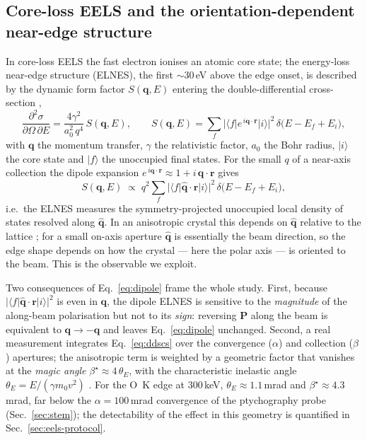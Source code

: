 \subsection{Core-loss EELS and the orientation-dependent near-edge structure}
\label{sec:eels-elnes}

In core-loss EELS the fast electron ionises an atomic core state; the energy-loss near-edge
structure (ELNES), the first ${\sim}30$\,eV above the edge onset, is described by the dynamic
form factor $S(\mathbf{q},E)$ entering the double-differential cross-section
\citep{Egerton2011},
\begin{equation}
  \frac{\partial^2\sigma}{\partial\Omega\,\partial E}
  = \frac{4\gamma^2}{a_0^2\,q^4}\,S(\mathbf{q},E),
  \qquad
  S(\mathbf{q},E) = \sum_f \big\lvert\langle f\lvert e^{\,i\mathbf{q}\cdot\mathbf{r}}\rvert i\rangle\big\rvert^2
  \,\delta\!\big(E - E_f + E_i\big),
  \label{eq:ddscs}
\end{equation}
with $\mathbf{q}$ the momentum transfer, $\gamma$ the relativistic factor, $a_0$ the Bohr
radius, $\lvert i\rangle$ the core state and $\lvert f\rangle$ the unoccupied final states.
For the small $q$ of a near-axis collection the dipole expansion
$e^{\,i\mathbf{q}\cdot\mathbf{r}}\approx 1 + i\,\mathbf{q}\cdot\mathbf{r}$ gives
\begin{equation}
  S(\mathbf{q},E) \;\propto\; q^2 \sum_f
  \big\lvert\langle f\lvert \hat{\mathbf{q}}\cdot\mathbf{r}\rvert i\rangle\big\rvert^2
  \,\delta\!\big(E - E_f + E_i\big),
  \label{eq:dipole}
\end{equation}
i.e.\ the ELNES measures the symmetry-projected unoccupied local density of states resolved
along $\hat{\mathbf{q}}$. In an anisotropic crystal this depends on $\hat{\mathbf{q}}$
relative to the lattice \citep{Nelhiebel1999}; for a small on-axis aperture
$\hat{\mathbf{q}}$ is essentially the beam direction, so the edge shape depends on how the
crystal --- here the polar axis --- is oriented to the beam. This is the observable we exploit.

Two consequences of Eq.~\eqref{eq:dipole} frame the whole study. First, because
$\lvert\langle f\lvert \hat{\mathbf{q}}\cdot\mathbf{r}\rvert i\rangle\rvert^2$ is even in
$\mathbf{q}$, the dipole ELNES is sensitive to the \emph{magnitude} of the along-beam
polarisation but not to its \emph{sign}: reversing $\mathbf{P}$ along the beam is equivalent
to $\mathbf{q}\to-\mathbf{q}$ and leaves Eq.~\eqref{eq:dipole} unchanged. Second, a real
measurement integrates Eq.~\eqref{eq:ddscs} over the convergence ($\alpha$) and collection
($\beta$) apertures; the anisotropic term is weighted by a geometric factor that vanishes at
the \emph{magic angle} $\beta^\star\!\approx 4\,\theta_E$, with the characteristic inelastic
angle $\theta_E = E/(\gamma m_0 v^2)$ \citep{Jouffrey2004}. For the O~K edge at
$300$\,keV, $\theta_E\approx 1.1$\,mrad and $\beta^\star\approx 4.3$\,mrad, far below the
$\alpha=100$\,mrad convergence of the ptychography probe (Sec.~\ref{sec:stem}); the
detectability of the effect in this geometry is quantified in Sec.~\ref{sec:eels-protocol}.

